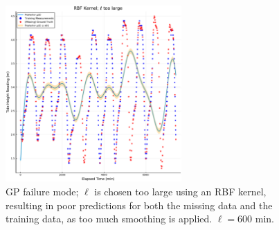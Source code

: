 \documentclass[a4paper, twocolumn, 10pt]{article}
\begin{document}
\begin{appendices}
\begin{figure}
	\includegraphics[width=0.6\textwidth]{badkernel2}
	\centering
	\caption{\label{l_too_big} GP failure mode; $\ell$ is chosen too large using an RBF kernel, resulting in poor predictions for both the missing data and the training data, as too much smoothing is applied. $\ell = 600 \text{ min}$.}
\end{figure}

	
\end{appendices}
\end{document}
